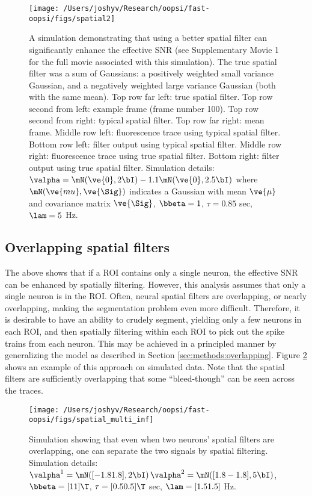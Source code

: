\begin{figure}[h!]
\centering \texttt{[image: /Users/joshyv/Research/oopsi/fast-oopsi/figs/spatial2]}
\caption[spatial filtering can improve effective SNR]{A simulation demonstrating that using a better spatial filter can significantly enhance the effective SNR (see Supplementary Movie 1 for the full movie associated with this simulation). The true spatial filter was a sum of Gaussians: a positively weighted small variance Gaussian, and a negatively weighted large variance Gaussian (both with the same mean).  Top row far left: true spatial filter.  Top row second from left: example frame (frame number 100). Top row second from right: typical spatial filter.   Top row far right: mean frame.  Middle row left: fluorescence trace using typical spatial filter. Bottom row left: \foopsi filter output using typical spatial filter.  Middle row right: fluorescence trace using true spatial filter.  Bottom right: \foopsi filter output using true spatial filter. Simulation details: $\valpha=\mN(\ve{0},2 \bI)-1.1 \mN(\ve{0},2.5 \bI)$ where $\mN(\ve{mu},\ve{\Sig})$ indicates a Gaussian with mean $\ve{\mu}$ and covariance matrix $\ve{\Sig}$, $\bbeta=1$, $\tau=0.85$ sec, $\lam=5$ Hz.} \label{fig:spatial} 
\end{figure}



\subsection{Overlapping spatial filters}


The above shows that if a ROI contains only a single neuron, the effective SNR can be enhanced by spatially filtering.  However, this analysis assumes that only a single neuron is in the ROI.  Often, neural spatial filters are overlapping, or nearly overlapping, making the segmentation problem even more difficult.  Therefore, it is desirable to have an ability to crudely segment, yielding only a few neurons in each ROI, and then spatially filtering within each ROI to pick out the spike trains from each neuron.  This may be achieved in a principled manner by generalizing the model as described in Section \ref{sec:methods:overlapping}.  Figure \ref{fig:spatial_multi_inf} shows an example of this approach on simulated data. Note that the spatial filters are sufficiently overlapping that some ``bleed-though'' can be seen across the traces.  


\begin{figure}[h!]
\centering \texttt{[image: /Users/joshyv/Research/oopsi/fast-oopsi/figs/spatial\_multi\_inf]}
\caption[overlapping spatial filters are not problematic]{Simulation showing that even when two neurons' spatial filters are overlapping, one can separate the two signals by spatial filtering. Simulation details: $\valpha^1=\mN([-1.8 1.8],2 \bI)\, \valpha^2=\mN([1.8 -1.8],5 \bI)$, $\bbeta=[1 1]\T$, $\tau=[0.5 0.5]\T$ sec, $\lam=[1.5 1.5]$ Hz.} \label{fig:spatial_multi_inf}
\end{figure}

